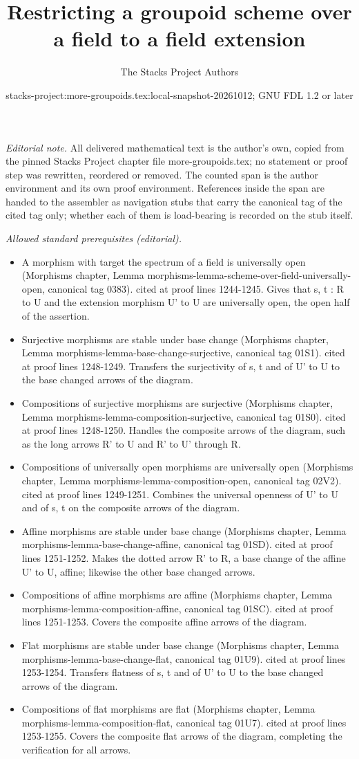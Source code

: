 \documentclass{stacks-project}
\title{Restricting a groupoid scheme over a field to a field extension}
\author{The Stacks Project Authors}
\date{stacks-project:more-groupoids.tex:local-snapshot-20261012; GNU FDL 1.2 or later}
\theoremstyle{plain}
\theoremstyle{definition}
\theoremstyle{remark}
\numberwithin{equation}{subsection}
\begin{document}
\maketitle
\setcounter{subsection}{1}
\noindent\textit{Editorial note.} All delivered mathematical text is the author's own, copied from the pinned Stacks Project chapter file more-groupoids.tex; no statement or proof step was rewritten, reordered or removed. The counted span is the author environment and its own proof environment. References inside the span are handed to the assembler as navigation stubs that carry the canonical tag of the cited tag only; whether each of them is load-bearing is recorded on the stub itself.\par\medskip
\noindent\textit{Allowed standard prerequisites (editorial).}\begin{itemize}
\item A morphism with target the spectrum of a field is universally open (Morphisms chapter, Lemma morphisms-lemma-scheme-over-field-universally-open, canonical tag 0383). cited at proof lines 1244-1245. Gives that s, t : R to U and the extension morphism U' to U are universally open, the open half of the assertion.
\item Surjective morphisms are stable under base change (Morphisms chapter, Lemma morphisms-lemma-base-change-surjective, canonical tag 01S1). cited at proof lines 1248-1249. Transfers the surjectivity of s, t and of U' to U to the base changed arrows of the diagram.
\item Compositions of surjective morphisms are surjective (Morphisms chapter, Lemma morphisms-lemma-composition-surjective, canonical tag 01S0). cited at proof lines 1248-1250. Handles the composite arrows of the diagram, such as the long arrows R' to U and R' to U' through R.
\item Compositions of universally open morphisms are universally open (Morphisms chapter, Lemma morphisms-lemma-composition-open, canonical tag 02V2). cited at proof lines 1249-1251. Combines the universal openness of U' to U and of s, t on the composite arrows of the diagram.
\item Affine morphisms are stable under base change (Morphisms chapter, Lemma morphisms-lemma-base-change-affine, canonical tag 01SD). cited at proof lines 1251-1252. Makes the dotted arrow R' to R, a base change of the affine U' to U, affine; likewise the other base changed arrows.
\item Compositions of affine morphisms are affine (Morphisms chapter, Lemma morphisms-lemma-composition-affine, canonical tag 01SC). cited at proof lines 1251-1253. Covers the composite affine arrows of the diagram.
\item Flat morphisms are stable under base change (Morphisms chapter, Lemma morphisms-lemma-base-change-flat, canonical tag 01U9). cited at proof lines 1253-1254. Transfers flatness of s, t and of U' to U to the base changed arrows of the diagram.
\item Compositions of flat morphisms are flat (Morphisms chapter, Lemma morphisms-lemma-composition-flat, canonical tag 01U7). cited at proof lines 1253-1255. Covers the composite flat arrows of the diagram, completing the verification for all arrows.
\end{itemize}\medskip
\end{document}
